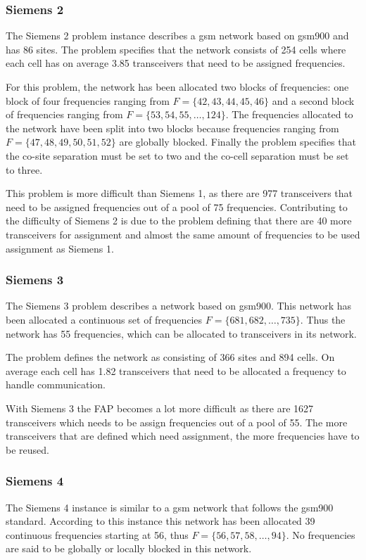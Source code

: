 \subsubsection{Siemens 2}
The Siemens 2 problem instance describes a \gls{gsm} network based on \gls{gsm}900 and has 86 sites. The problem specifies that the network consists of 254 cells where each cell has on average 3.85 transceivers that need to be assigned frequencies.

For this problem, the network has been allocated two blocks of frequencies: one block of four frequencies ranging from $F = \{42,43,44,45,46\}$ and a second block of frequencies ranging from $F= \{53,54,55,\dots,124\}$. The frequencies allocated to the network have been split into two blocks because frequencies ranging from $F = \{47,48,49,50,51,52\}$ are globally blocked. Finally the problem specifies that the co-site separation must be set to two and the co-cell separation must be set to three.

This problem is more difficult than Siemens 1, as there are 977 transceivers that need to be assigned frequencies out of a pool of 75 frequencies. Contributing to the difficulty of Siemens 2 is due to the problem defining that there are 40 more transceivers for assignment and almost the same amount of frequencies to be used assignment as Siemens 1.
\subsubsection{Siemens 3}
The Siemens 3 problem describes a network based on \gls{gsm}900. This network has been allocated a continuous set of frequencies $F= \{681,682, \dots, 735\}$. Thus the network has 55 frequencies, which can be allocated to transceivers in its network.

The problem defines the network as consisting of 366 sites and 894 cells. On average each cell has 1.82 transceivers that need to be allocated a frequency to handle communication.

With Siemens 3 the FAP becomes a lot more difficult as there are  1627 transceivers which needs to be assign frequencies out of a pool of 55. The more transceivers that are defined which need assignment, the more frequencies have to be reused.
\subsubsection{Siemens 4}
The Siemens 4 instance is similar to a \gls{gsm} network that follows the \gls{gsm}900 standard. According to this instance this network has been allocated 39 continuous frequencies starting at 56, thus $F = \{56,57,58,\dots,94\}$. No frequencies are said to be globally or locally blocked in this network.

